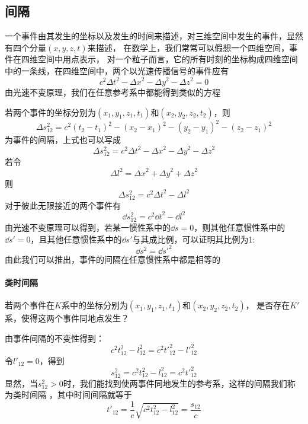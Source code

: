 \documentclass[12pt]{report}
\begin{document}
\subsection{间隔}
一个事件由其发生的坐标以及发生的时间来描述，对三维空间中发生的事件，显然有四个分量$(x,y,z,t)$来描述，
在数学上，我们常常可以假想一个四维空间，事件在四维空间中用点表示，
对一个粒子而言，它的所有时刻的坐标构成四维空间中的一条线，在四维空间中，两个以光速传播信号的事件应有
$$c^2{\Delta t}^2-{\Delta x}^2-{\Delta y}^2-{\Delta z}^2=0$$
由光速不变原理，我们在任意参考系中都能得到类似的方程\par
若两个事件的坐标分别为$(x_1,y_1,z_1,t_1)$和$(x_2,y_2,z_2,t_2)$，则
\begin{equation}
    \Delta s_{12}^2=c^2\left(t_2-t_1\right)^2-\left(x_2-x_1\right)^2-\left(y_2-y_1\right)^2-\left(z_2-z_1\right)^2
\end{equation}
为事件的间隔，上式也可以写成
\begin{equation}
    \Delta s_{12}^2=c^2{\Delta t}^2-{\Delta x}^2-{\Delta y}^2-{\Delta z}^2
\end{equation}
若令
$${\Delta l}^2={\Delta x}^2+{\Delta y}^2+{\Delta z}^2$$
则
\begin{equation}
    \Delta s_{12}^2=c^2{\Delta t}^2-{\Delta l}^2
\end{equation}
对于彼此无限接近的两个事件有
\begin{equation}
    \dd s_{12}^2=c^2{\dd t}^2-\dd l^2
\end{equation}
由光速不变原理可以得到，若某一惯性系中的$\dd s=0$，则其他任意惯性系中的$\dd s'=0$，且其他任意惯性系中的$\dd s'$与其成比例，可以证明其比例为1:
$$\dd s^2=\dd {s'}^2$$
由此我们可以推出，事件的间隔在任意惯性系中都是相等的
\paragraph{类时间隔}
若两个事件在$K$系中的坐标分别为$(x_1,y_1,z_1,t_1)$和$(x_2,y_2,z_2,t_2)$，
是否存在$K'$系，使得这两个事件同地点发生？

由事件间隔的不变性得到：
\begin{equation*}
    c^2 t_{12}^2-l_{12}^2=c^2 {t'}_{12}^2-{l'}_{12}^2
\end{equation*}
令${l'}_{12}=0$，得到
$$s_{12}^2=c^2t_{12}^2-l_{12}^2=c^2 {t'}_{12}^2$$
显然，当$s_{12}^2>0$时，我们能找到使两事件同地发生的参考系，这样的间隔我们称为类时间隔
，其中时间间隔就等于
\begin{equation}
    {t'}_{12}=\frac{1}{c} \sqrt{c^2t_{12}^2-l_{12}^2}=\frac{s_{12}}{c}
    \label{类时间隔}
\end{equation}
\end{document}
